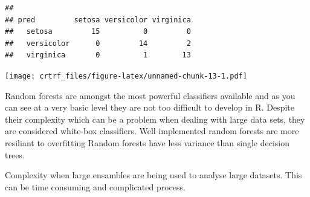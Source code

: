 \documentclass[
]{article}
\newenvironment{Shaded}{\begin{snugshade}}{\end{snugshade}}
\newcommand{\KeywordTok}[1]{\textcolor[rgb]{0.13,0.29,0.53}{\textbf{#1}}}
\newcommand{\NormalTok}[1]{#1}
\newcommand{\OperatorTok}[1]{\textcolor[rgb]{0.81,0.36,0.00}{\textbf{#1}}}
\newcommand{\StringTok}[1]{\textcolor[rgb]{0.31,0.60,0.02}{#1}}
\begin{document}
\begin{Shaded}
\end{Shaded}

\begin{verbatim}
##             
## pred         setosa versicolor virginica
##   setosa         15          0         0
##   versicolor      0         14         2
##   virginica       0          1        13
\end{verbatim}

\texttt{[image: crtrf\_files/figure-latex/unnamed-chunk-13-1.pdf]}

Random forests are amongst the most powerful classifiers available and
as you can see at a very basic level they are not too difficult to
develop in R. Despite their complexity which can be a problem when
dealing with large data sets, they are considered white-box classifiers.
Well implemented random forests are more resiliant to overfitting Random
forests have less variance than single decision trees.

Complexity when large ensambles are being used to analyse large
datasets. This can be time consuming and complicated process.
\end{document}
